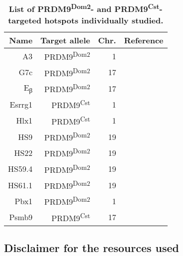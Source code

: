 \begin{table}[h]
    \centering
	\begin{adjustbox}{width = 1\textwidth}
    \begin{tabular}{rrrr}
        \toprule
        \textbf{Name} & \textbf{Target allele} & \textbf{Chr.} & \textbf{Reference} \\

        \midrule
        A3 & PRDM9\textsuperscript{Dom2} & 1 & \citet{kelmenson2005torrid, cole2010comprehensive} \\
        G7c & PRDM9\textsuperscript{Dom2} & 17 & \citet{snoek1998molecular} \\
        E\textsubscript{\textgreek{β}} & PRDM9\textsuperscript{Dom2} & 17 & \citet{steinmetz1982molecular} \\ %
        Esrrg1 & PRDM9\textsuperscript{Cst} & 1 & \citet{billings2013dna} \\
        Hlx1 & PRDM9\textsuperscript{Cst} & 1 & \citet{ng2008quantitative,billings2013dna} \\
        HS9 & PRDM9\textsuperscript{Dom2} & 19 & \citet{bois2007highly,getun2010nucleosome} \\%
        HS22 & PRDM9\textsuperscript{Dom2} & 19 & \citet{getun2010nucleosome} \\
        HS59.4 & PRDM9\textsuperscript{Dom2} & 19 & \citet{getun2010nucleosome} \\
        HS61.1 & PRDM9\textsuperscript{Dom2} & 19 & \citet{wu2010anatomy,getun2010nucleosome} \\
        Pbx1 & PRDM9\textsuperscript{Dom2} & 1 & \citet{billings2013dna,baker2015multimer} \\
        Psmb9 & PRDM9\textsuperscript{Cst} & 17 & \citet{guillon2002initiation,baudat2007cis} \\
        \bottomrule
    \end{tabular}
	\end{adjustbox}
    \caption[List of PRDM9\textsuperscript{Dom2}- and PRDM9\textsuperscript{Cst}-targeted hotspots individually studied]
    {\textbf{List of PRDM9\textsuperscript{Dom2}- and PRDM9\textsuperscript{Cst}-targeted hotspots individually studied.}
    }
\label{tab:hotspots-studied-sperm-typing}
\end{table}


\subsection{Disclaimer for the resources used}

